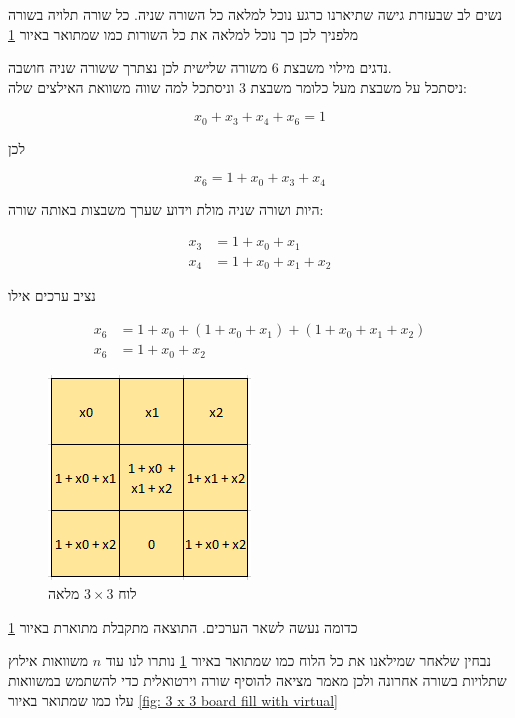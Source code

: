 \documentclass[12pt,twoside]{article}
\begin{document}
נשים לב שבעזרת גישה שתיארנו כרגע נוכל למלאה כל השורה שניה.
כל שורה תלויה בשורה מלפניך לכן כך נוכל למלאה את כל השורות 
כמו שמתואר באיור 
\ref{fig: 3 x 3 board fill intire board}

נדגים מילוי משבצת
$6$
משורה שלישית לכן נצתרך ששורה
שניה חושבה.
\\
ניסתכל על משבצת מעל 
כלומר משבצת 
$3$
וניסתכל למה שווה משוואת האילצים שלה:

\[ x_0 + x_3 + x_4 + x_6 = 1 \]

לכן 

\[ x_6 = 1 + x_0 + x_3 + x_4  \]

היות ושורה שניה מולת וידוע שערך משבצות 
באותה שורה: 

\begin{align*}
    x_3 &= 1 + x_0 + x_1 \\
    x_4 &= 1 + x_0 + x_1 + x_2
\end{align*}
    


נציב ערכים אילו

\begin{align*}
    x_6 &= 1 + x_0 + (1 + x_0 + x_1) + (1 + x_0 + x_1 + x_2) \\
    x_6 &= 1 + x_0 + x_2
\end{align*}

\begin{figure}[ht]
    \caption{לוח 
    $3 \times 3$
    מלאה}
    \label{fig: 3 x 3 board fill intire board}
    \unsethebrew
    \centering
    \includegraphics[width=.3\textwidth,height=.3\textheight,keepaspectratio]{images/3x3_fill_all.PNG}
\end{figure}
\sethebrew

כדומה נעשה לשאר הערכים.
התוצאה מתקבלת מתוארת באיור 
\ref{fig: 3 x 3 board fill intire board}

נבחין שלאחר שמילאנו את כל הלוח כמו שמתואר באיור 
\ref{fig: 3 x 3 board fill intire board}
נותרו לנו עוד 
$n$
משוואות אילוץ שתלויות בשורה אחרונה ולכן מאמר 
\cite{B1}
מציאה להוסיף שורה וירטואלית כדי להשתמש 
במשוואות עלו
כמו שמתואר באיור 
\ref{fig: 3 x 3 board fill with virtual}
\end{document}
